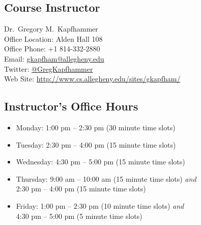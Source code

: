


% 

\subsection*{Course Instructor}
Dr.\ Gregory M.\ Kapfhammer\\
\noindent Office Location: Alden Hall 108 \\
\noindent Office Phone: +1 814-332-2880 \\
\noindent Email: \url{gkapfham@allegheny.edu} \\
\noindent Twitter: \url{@GregKapfhammer} \\
\noindent Web Site: \url{http://www.cs.allegheny.edu/sites/gkapfham/} 

\subsection*{Instructor's Office Hours}

\begin{itemize}
	\itemsep 0em
	\item Monday: 1:00 pm -- 2:30 pm (30 minute time slots)
	\item Tuesday: 2:30 pm -- 4:00 pm (15 minute time slots)
	\item Wednesday: 4:30 pm -- 5:00 pm (15 minute time slots)
	\item Thursday: 9:00 am -- 10:00 am (15 minute time slots) {\em and} \\ \hspace*{.69in} 2:30 pm -- 4:00 pm (15 minute time slots)
	\item Friday: 1:00 pm -- 2:30 pm (10 minute time slots) {\em and} \\ \hspace*{.49in} 4:30 pm -- 5:00 pm (5 minute time slots)
\end{itemize}

